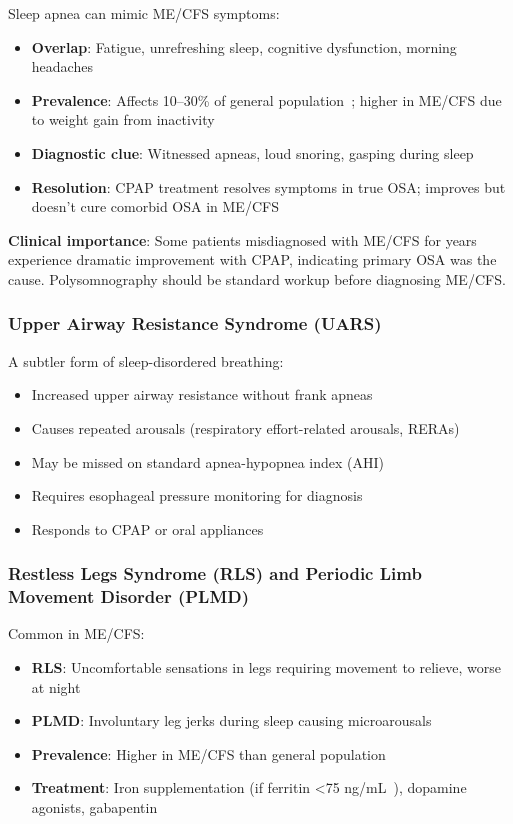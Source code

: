 Sleep apnea can mimic ME/CFS symptoms:
\begin{itemize}
    \item \textbf{Overlap}: Fatigue, unrefreshing sleep, cognitive dysfunction, morning headaches
    \item \textbf{Prevalence}: Affects 10--30\% of general population~\cite{Peppard2013OSAprevalence,Senaratna2017OSAmeta,Young2002OSAepidemiology}; higher in ME/CFS due to weight gain from inactivity
    \item \textbf{Diagnostic clue}: Witnessed apneas, loud snoring, gasping during sleep
    \item \textbf{Resolution}: CPAP treatment resolves symptoms in true OSA; improves but doesn't cure comorbid OSA in ME/CFS
\end{itemize}

\textbf{Clinical importance}: Some patients misdiagnosed with ME/CFS for years experience dramatic improvement with CPAP, indicating primary OSA was the cause. Polysomnography should be standard workup before diagnosing ME/CFS.

\subsubsection{Upper Airway Resistance Syndrome (UARS)}

A subtler form of sleep-disordered breathing:
\begin{itemize}
    \item Increased upper airway resistance without frank apneas
    \item Causes repeated arousals (respiratory effort-related arousals, RERAs)
    \item May be missed on standard apnea-hypopnea index (AHI)
    \item Requires esophageal pressure monitoring for diagnosis
    \item Responds to CPAP or oral appliances
\end{itemize}

\subsubsection{Restless Legs Syndrome (RLS) and Periodic Limb Movement Disorder (PLMD)}

Common in ME/CFS:
\begin{itemize}
    \item \textbf{RLS}: Uncomfortable sensations in legs requiring movement to relieve, worse at night
    \item \textbf{PLMD}: Involuntary leg jerks during sleep causing microarousals
    \item \textbf{Prevalence}: Higher in ME/CFS than general population
    \item \textbf{Treatment}: Iron supple\-mentation (if ferritin <75 ng/mL~\cite{Allen2018RLSironThreshold}), dopamine agonists, gabapentin
\end{itemize}

